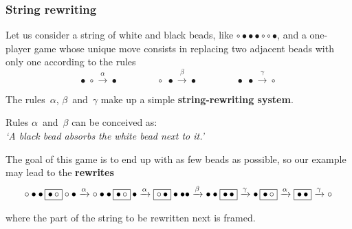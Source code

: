 \documentclass[compress,dvipdfmx]{beamer}
\begin{document}
\begin{frame}
  \frametitle{String rewriting}

  Let us consider a string of white and black beads, like \(\circ
  \bullet \bullet \bullet \circ \circ \bullet\), and a one-player game
  whose unique move consists in replacing two adjacent beads with only
  one according to the rules
  \begin{equation*}
    \bullet \; \circ   \xrightarrow{\alpha} \bullet\qquad\qquad
    \circ   \; \bullet \xrightarrow{\beta} \bullet\qquad\qquad
    \bullet \; \bullet \xrightarrow{\gamma} \circ
  \end{equation*}

  The rules~\(\alpha\), \(\beta\)~and~\(\gamma\) make up a simple
  \textbf{string\hyp{}rewriting system}.

  \bigskip

  Rules \(\alpha\)~and~\(\beta\) can be conceived as:\\ \emph{`A black
  bead absorbs the white bead next to it.'}

  \bigskip

  The goal of this game is to end up with as few beads as possible, so
  our example may lead to the \textbf{rewrites}
  \begin{equation*}
    \circ \bullet \bullet \, \fbox{\(\bullet \, \circ\)} \circ \bullet
    \xrightarrow{\alpha} \circ \bullet \bullet \, \fbox{\(\bullet \,
      \circ\)} \, \bullet \xrightarrow{\alpha} \fbox{\(\circ \,
      \bullet\)} \bullet \bullet \bullet \xrightarrow{\beta} \bullet
    \bullet \fbox{\(\bullet \, \bullet\)} \xrightarrow{\gamma} \bullet \,
    \fbox{\(\bullet \, \circ\)} \xrightarrow{\alpha} \fbox{\(\bullet
      \, \bullet\)} \xrightarrow{\gamma} \circ
  \end{equation*}

  \medskip

  \noindent where the part of the string to be rewritten next is
  framed.

\end{frame}
\end{document}
